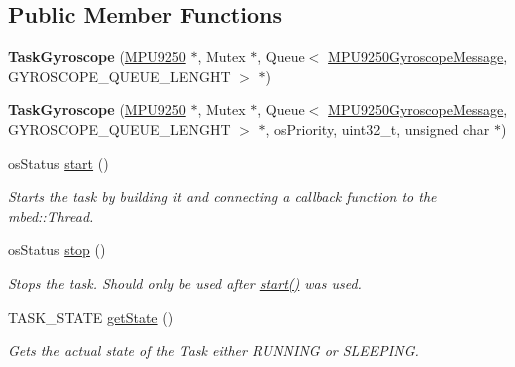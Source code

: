 \subsection*{Public Member Functions}
\begin{DoxyCompactItemize}
\item 
\hypertarget{class_task_gyroscope_ab3badc3ac9343ce7f8817d04cd074b53}{}{\bfseries Task\+Gyroscope} (\hyperlink{class_m_p_u9250}{M\+P\+U9250} $\ast$, Mutex $\ast$, Queue$<$ \hyperlink{class_m_p_u9250_gyroscope_message}{M\+P\+U9250\+Gyroscope\+Message}, G\+Y\+R\+O\+S\+C\+O\+P\+E\+\_\+\+Q\+U\+E\+U\+E\+\_\+\+L\+E\+N\+G\+H\+T $>$ $\ast$)\label{class_task_gyroscope_ab3badc3ac9343ce7f8817d04cd074b53}

\item 
\hypertarget{class_task_gyroscope_ac672e72bfa5711f59533cdd135679469}{}{\bfseries Task\+Gyroscope} (\hyperlink{class_m_p_u9250}{M\+P\+U9250} $\ast$, Mutex $\ast$, Queue$<$ \hyperlink{class_m_p_u9250_gyroscope_message}{M\+P\+U9250\+Gyroscope\+Message}, G\+Y\+R\+O\+S\+C\+O\+P\+E\+\_\+\+Q\+U\+E\+U\+E\+\_\+\+L\+E\+N\+G\+H\+T $>$ $\ast$, os\+Priority, uint32\+\_\+t, unsigned char $\ast$)\label{class_task_gyroscope_ac672e72bfa5711f59533cdd135679469}

\item 
os\+Status \hyperlink{class_task_gyroscope_a0306fb16429f8582db336a1140eae0b1}{start} ()
\begin{DoxyCompactList}\small\item\em Starts the task by building it and connecting a callback function to the mbed\+::\+Thread. \end{DoxyCompactList}\item 
os\+Status \hyperlink{class_task_gyroscope_ac7bfab751b2d88fb050ba9d144e80e9f}{stop} ()
\begin{DoxyCompactList}\small\item\em Stops the task. Should only be used after \hyperlink{class_task_gyroscope_a0306fb16429f8582db336a1140eae0b1}{start()} was used. \end{DoxyCompactList}\item 
T\+A\+S\+K\+\_\+\+S\+T\+A\+T\+E \hyperlink{class_task_gyroscope_a6a0dc96b7cedfa9f6bc3f073827596df}{get\+State} ()
\begin{DoxyCompactList}\small\item\em Gets the actual state of the Task either R\+U\+N\+N\+I\+N\+G or S\+L\+E\+E\+P\+I\+N\+G. \end{DoxyCompactList}\end{DoxyCompactItemize}


